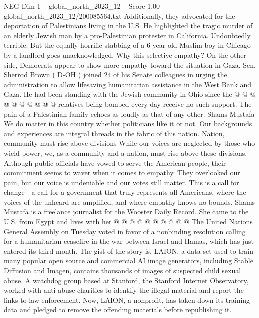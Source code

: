 \begin{textsample}{NEG Dim 1 – global\_north\_2023\_12 – Score 1.00 – global\_north\_2023\_12/200085564.txt}
Additionally, they advocated for the deportation of Palestinians living in the U.S.
He highlighted the tragic murder of an elderly Jewish man by a pro-Palestinian protester in California.
Undoubtedly terrible.
But the equally horrific stabbing of a 6-year-old Muslim boy in Chicago by a landlord goes unacknowledged.
Why this selective empathy?
On the other side, Democrats appear to show more empathy toward the situation in Gaza.
Sen.
Sherrod Brown ( D-OH ) joined 24 of his Senate colleagues in urging the administration to allow lifesaving humanitarian assistance in the West Bank and Gaza.
He had been standing with the Jewish community in Ohio since the @ @ @ @ @ @ @ @ @ @ relatives being bombed every day receive no such support.
The pain of a Palestinian family echoes as loudly as that of any other.
Shams Mustafa We do matter in this country whether politicians like it or not.
Our backgrounds and experiences are integral threads in the fabric of this nation.
Nation, community must rise above divisions While our voices are neglected by those who wield power, we, as a community and a nation, must rise above these divisions.
Although public officials have vowed to serve the American people, their commitment seems to waver when it comes to empathy.
They overlooked our pain, but our voice is undeniable and our votes still matter.
This is a call for change - a call for a government that truly represents all Americans, where the voices of the unheard are amplified, and where empathy knows no bounds.
Shams Mustafa is a freelance journalist for the Wooster Daily Record.
She came to the U.S. from Egypt and lives with her @ @ @ @ @ @ @ @ @ @ The United Nations General Assembly on Tuesday voted in favor of a nonbinding resolution calling for a humanitarian ceasefire in the war between Israel and Hamas, which has just entered its third month.
The gist of the story is, LAION, a data set used to train many popular open source and commercial AI image generators, including Stable Diffusion and Imagen, contains thousands of images of suspected child sexual abuse.
A watchdog group based at Stanford, the Stanford Internet Observatory, worked with anti-abuse charities to identify the illegal material and report the links to law enforcement.
Now, LAION, a nonprofit, has taken down its training data and pledged to remove the offending materials before republishing it.

\end{textsample}
